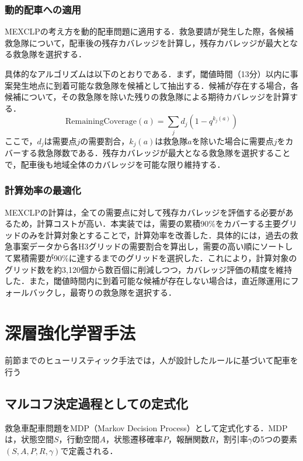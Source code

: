 \subsubsection{動的配車への適用}
MEXCLPの考え方を動的配車問題に適用する．救急要請が発生した際，各候補救急隊について，配車後の残存カバレッジを計算し，残存カバレッジが最大となる救急隊を選択する．

具体的なアルゴリズムは以下のとおりである．まず，閾値時間（13分）以内に事案発生地点に到着可能な救急隊を候補として抽出する．候補が存在する場合，各候補について，その救急隊を除いた残りの救急隊による期待カバレッジを計算する．
\[
  \mathrm{RemainingCoverage}(a) = \sum_{j} d_j \left( 1 - q^{k_j(a)} \right)
\]
ここで，$d_j$は需要点$j$の需要割合，$k_j(a)$は救急隊$a$を除いた場合に需要点$j$をカバーする救急隊数である．残存カバレッジが最大となる救急隊を選択することで，配車後も地域全体のカバレッジを可能な限り維持する．

\subsubsection{計算効率の最適化}
MEXCLPの計算は，全ての需要点に対して残存カバレッジを評価する必要があるため，計算コストが高い．本実装では，需要の累積90\%をカバーする主要グリッドのみを計算対象とすることで，計算効率を改善した．具体的には，過去の救急事案データから各H3グリッドの需要割合を算出し，需要の高い順にソートして累積需要が90\%に達するまでのグリッドを選択した．これにより，計算対象のグリッド数を約3,120個から数百個に削減しつつ，カバレッジ評価の精度を維持した．また，閾値時間内に到着可能な候補が存在しない場合は，直近隊運用にフォールバックし，最寄りの救急隊を選択する．


\section{深層強化学習手法}
前節までのヒューリスティック手法では，人が設計したルールに基づいて配車を行う

\subsection{マルコフ決定過程としての定式化}
救急車配車問題をMDP（Markov Decision Process）として定式化する．MDPは，状態空間$S$，行動空間$A$，状態遷移確率$P$，報酬関数$R$，割引率$\gamma$の5つの要素$(S, A, P, R, \gamma)$で定義される．

